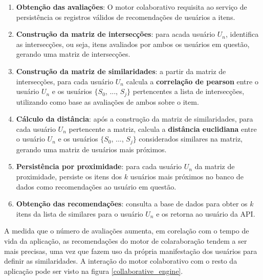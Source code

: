 \begin{enumerate}
	\item \textbf{Obtenção das avaliações}: O motor colaborativo requisita ao serviço de persistência os registros válidos de recomendações de usuários a itens.

	\item \textbf{Construção da matriz de intersecções}: para acada usuário $U_{n}$, identifica as intersecções, ou seja, itens avaliados por ambos os usuários em questão, gerando uma matriz de intersecções.

	\item \textbf{Construção da matriz de similaridades}: a partir da matriz de intersecções, para cada usuário $U_{n}$ calcula a \textbf{correlação de pearson} entre o usuário $U_{n}$ e os usuários $\lbrace S_{0}$, ..., $S_{j} \rbrace$ pertencentes a lista de intersecções, utilizando como base as avaliações de ambos sobre o item.

	\item \textbf{Cálculo da distância}: após a construção da matriz de similaridades, para cada usuário $U_{n}$ pertencente a matriz, calcula a \textbf{distância euclidiana} entre o usuário $U_{n}$ e os usuários $\lbrace S_{0}$, ..., $S_{j} \rbrace$ considerados similares na matriz, gerando uma matriz de usuários mais próximos.

	\item \textbf{Persistência por proximidade}: para cada usuário $U_{n}$ da matriz de proximidade, persiste os itens dos $k$ usuários mais próximos no banco de dados como recomendações ao usuário em questão.

	\item \textbf{Obtenção das recomendações}: consulta a base de dados para obter os $k$ itens da lista de similares para o usuário $U_{n}$ e os retorna ao usuário da API.
\end{enumerate}

A medida que o número de avaliações aumenta, em corelação com o tempo de vida da aplicação, as recomendações do motor de colaraboração tendem a ser mais precisas, uma vez que fazem uso da própria manifestação dos usuários para definir as similaridades. A interação do motor colaborativo com o resto da aplicação pode ser visto na figura \ref{collaborative_engine}.

